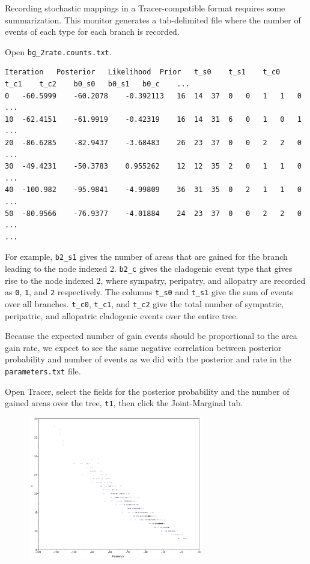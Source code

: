 \documentclass[11pt]{article}
\begin{document}
Recording stochastic mappings in a Tracer-compatible format requires some summarization.
This monitor generates a tab-delimited file where the number of events of each type for each branch is recorded.

Open {\tt bg\_2rate.counts.txt}.

\begin{framed}
\begin{lstlisting}[basicstyle=\tiny \listingsfont, columns=texcl]
Iteration	Posterior	Likelihood	Prior	t_s0	t_s1	t_c0	t_c1	t_c2	b0_s0	b0_s1	b0_c	...
0	-60.5999	-60.2078	-0.392113	16	14	37	0	0	1	1	0	...
10	-62.4151	-61.9919	-0.42319	16	14	31	6	0	1	0	1	...
20	-86.6285	-82.9437	-3.68483	26	23	37	0	0	2	2	0	...
30	-49.4231	-50.3783	0.955262	12	12	35	2	0	1	1	0	...
40	-100.982	-95.9841	-4.99809	36	31	35	0	2	1	1	0	...
50	-80.9566	-76.9377	-4.01884	24	23	37	0	0	2	2	0	...
...
\end{lstlisting}
\end{framed}

For example, {\tt b2\_s1} gives the number of areas that are gained for the branch leading to the node indexed 2.
{\tt b2\_c} gives the cladogenic event type that gives rise to the node indexed 2, where sympatry, peripatry, and allopatry are recorded as {\tt 0}, {\tt 1}, and {\tt 2} respectively. The columns {\tt t\_s0} and {\tt t\_s1} give the sum of events over all branches. {\tt t\_c0}, {\tt t\_c1}, and {\tt t\_c2} give the total number of sympatric, peripatric, and allopatric cladogenic events over the entire tree.

Because the expected number of gain events should be proportional to the area gain rate, we expect to see the same negative correlation between posterior probability and number of events as we did with the posterior and rate in the {\tt parameters.txt} file.

Open Tracer, select the fields for the posterior probability and the number of gained areas over the tree, {\tt t1}, then click the Joint-Marginal tab.

\begin{figure}[H]
\centering
\includegraphics[width=3in]{figures/joint_ngain_posterior}
\end{figure}
\end{document}
